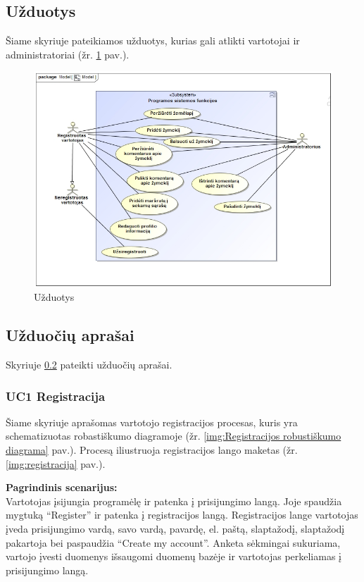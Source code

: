 \documentclass{VUMIFPSkursinis}
\begin{document}
\subsection{Užduotys}

Šiame skyriuje pateikiamos užduotys, kurias gali atlikti vartotojai ir administratoriai (žr. \ref{img:uzduotys} pav.).
	\begin{figure}[H]
				\centering
				\includegraphics[scale=0.5]{img/uzduotys}
				\caption{Užduotys}
				\label{img:uzduotys}
			\end{figure}

\subsection{Užduočių aprašai}
\label{sec:Užduočių aprašai}
Skyriuje \ref{sec:Užduočių aprašai} pateikti užduočių aprašai.
\subsubsection{UC1 Registracija}
	Šiame skyriuje aprašomas vartotojo registracijos procesas, kuris yra schematizuotas robastiškumo diagramoje (žr. \ref{img:Registracijos robustiškumo diagrama} pav.). 
	Procesą iliustruoja registracijos lango maketas (žr. \ref{img:registracija} pav.).

	\textbf{Pagrindinis scenarijus:}\\
	Vartotojas įsijungia programėlę ir patenka į prisijungimo langą. Joje spaudžia mygtuką “Register” ir patenka į registracijos langą. 
	Registracijos lange vartotojas įveda prisijungimo vardą, savo vardą, pavardę, el. paštą, slaptažodį, slaptažodį pakartoja bei paspaudžia 
	“Create my account”. Anketa sėkmingai sukuriama, vartojo įvesti duomenys išsaugomi duomenų bazėje ir vartotojas perkeliamas į prisijungimo langą.
\end{document}
